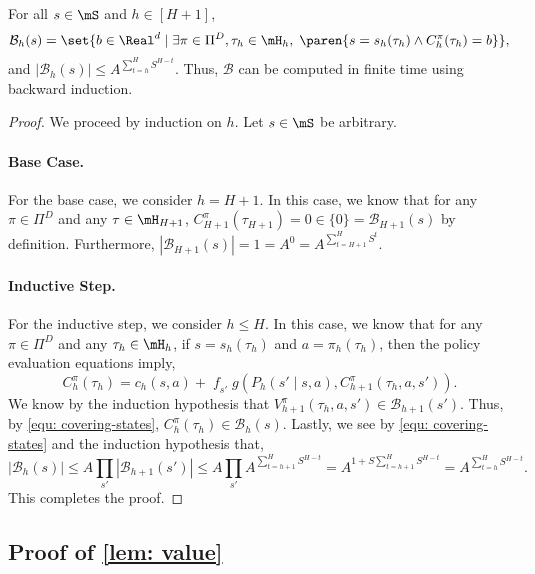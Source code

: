 \documentclass[pdftex, a4paper, 12pt]{article}
\newcommand{\mB}{\mathcal{B}}
\DeclareMathOperator*{\f}{\mathit{f}}
\begin{document}
\begin{lemma}\label{lem: value-space}
    For all $s \in \mS$ and $h \in [H+1]$, 
    \begin{equation}
        \mB_h(s) = \set{b \in \Real^d \mid \exists \pi \in \Pi^D, \tau_h \in \mH_h, \; \paren{s = s_h(\tau_h) \wedge C_h^{\pi}(\tau_h) = b}},
    \end{equation}
    and $|\mB_h(s)| \leq A^{\sum_{t=h}^{H} S^{H-t}}$. Thus, $\mB$ can be computed in finite time using backward induction. 
\end{lemma}

\begin{proof}
    We proceed by induction on $h$. Let $s \in \mS$ be arbitrary. 
    
    \paragraph{Base Case.} For the base case, we consider $h = H+1$. In this case, we know that for any $\pi \in \Pi^D$ and any $\tau \in \mH_{H+1}$, $C_{H+1}^{\pi}(\tau_{H+1}) = 0 \in \{0\} = \mB_{H+1}(s)$ by definition. Furthermore, $|\mB_{H+1}(s)| = 1 = A^0 = A^{\sum_{t = H+1}^{H}S^t}$.
    
    \paragraph{Inductive Step.} For the inductive step, we consider $h \leq H$. In this case, we know that for any $\pi \in \Pi^D$ and any $\tau_h \in \mH_{h}$, 
    if $s = s_h(\tau_h)$ and $a = \pi_h(\tau_h)$, then the policy evaluation equations imply,
    \begin{equation*}
        C_h^{\pi}(\tau_h) = c_h(s,a) + \f_{s'} g(P_h(s' \mid s,a), C_{h+1}^{\pi}(\tau_h, a, s')).
    \end{equation*}
    We know by the induction hypothesis that $V_{h+1}^{\pi}(\tau_h, a, s') \in \mB_{h+1}(s')$. Thus, by \eqref{equ: covering-states}, $C_h^{\pi}(\tau_h) \in \mB_h(s)$.
    Lastly, we see by \eqref{equ: covering-states} and the induction hypothesis that,
    \begin{equation*}
        |\mB_h(s)| \leq A\prod_{s'} |\mB_{h+1}(s')| \leq A \prod_{s'} A^{\sum_{t = h+1}^{H} S^{H-t}} = A^{1 +S\sum_{t = h+1}^H S^{H-t}} = A^{\sum_{t = h}^H S^{H-t}}.
    \end{equation*}
    This completes the proof.
\end{proof}


\subsection{Proof of \texorpdfstring{\cref{lem: value}}{lem: value}}
\end{document}
